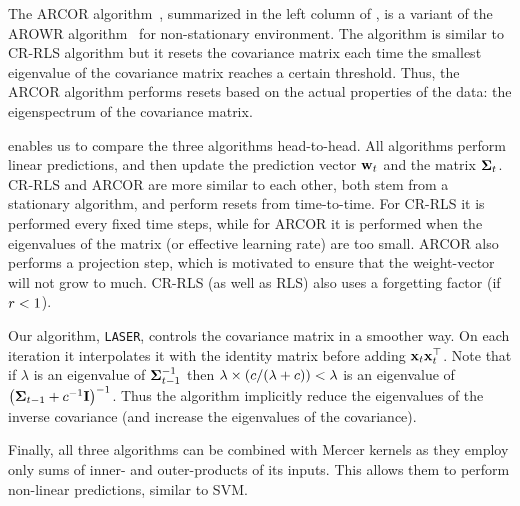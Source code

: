 The ARCOR algorithm~\citep{VaitsCr11},
summarized in the left column of , is a variant of the AROWR algorithm~\citep{VaitsCr11,CrammerKuDr12} for non-stationary environment. The algorithm is similar to CR-RLS algorithm but it resets the covariance matrix each time the smallest eigenvalue of the covariance matrix reaches a certain threshold. Thus, the ARCOR algorithm performs resets based on the actual properties of the data: the eigenspectrum of the covariance matrix.

 enables us to compare the three algorithms head-to-head. All algorithms perform linear predictions, and then update the prediction vector $\mathbf{w}_{t}$ and the matrix $\mathbf{\Sigma}_{t}$.
CR-RLS and ARCOR are more similar to each other, both stem from a stationary algorithm, and perform resets from time-to-time. For CR-RLS it is performed every fixed time steps, while for ARCOR it is performed when the eigenvalues of the matrix (or effective learning rate) are too small. ARCOR also performs a projection step, which is motivated to ensure that the weight-vector will not grow to much. CR-RLS (as well as RLS) also uses a forgetting factor (if $r<1$).

Our algorithm, \texttt{LASER}, controls the covariance matrix in a smoother way. On each iteration it interpolates it with the identity matrix before adding $\mathbf{x}_{t}{\mathbf{x}}^{\top}_{t}$. Note that if $\lambda$ is an eigenvalue of $\mathbf{\Sigma}_{t-1}^{-1}$ then $\lambda\times\left({c/(\lambda+c)}\right) < \lambda$ is an eigenvalue of $\left({\mathbf{\Sigma}_{t-1} + c^{-1} \mathbf{I}}\right)^{-1}$. Thus the algorithm implicitly reduce the eigenvalues of the inverse covariance (and increase the eigenvalues of the covariance).

Finally, all three algorithms can be combined with Mercer kernels as they employ only
sums of inner- and outer-products of its inputs. This allows them to perform non-linear predictions, similar to SVM.


